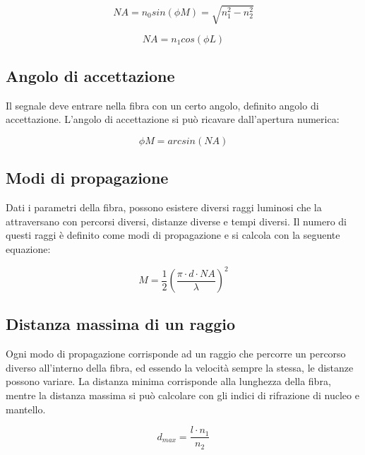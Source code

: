 \documentclass{article}
\begin{document}
    \begin{equation}
        NA = n_0 sin(\phi M) = \sqrt{n_1^2 - n_2^2}
    \end{equation}

    \begin{equation}
        NA = n_1 cos(\phi L)
    \end{equation}

    \subsection{Angolo di accettazione}

    Il segnale deve entrare nella fibra con un certo angolo, definito angolo di accettazione. L'angolo di accettazione si
    può ricavare dall'apertura numerica:

    \begin{equation}
        \phi M = arcsin(NA)
    \end{equation}

    \subsection{Modi di propagazione}

    Dati i parametri della fibra, possono esistere diversi raggi luminosi che la attraversano con percorsi diversi, distanze diverse
    e tempi diversi. Il numero di questi raggi è definito come modi di propagazione e si calcola con la seguente equazione:

    \begin{equation}
        M = \frac{1}{2} (\frac{\pi \cdot d \cdot NA}{\lambda})^2
    \end{equation}

    \subsection{Distanza massima di un raggio}

    Ogni modo di propagazione corrisponde ad un raggio che percorre un percorso diverso all'interno
    della fibra, ed essendo la velocità sempre la stessa, le distanze possono variare. La distanza minima
    corrisponde alla lunghezza della fibra, mentre la distanza massima si può calcolare con gli indici
    di rifrazione di nucleo e mantello.

    \begin{equation}
        d_{max} = \frac{l \cdot n_1}{n_2}
    \end{equation}
\end{document}
